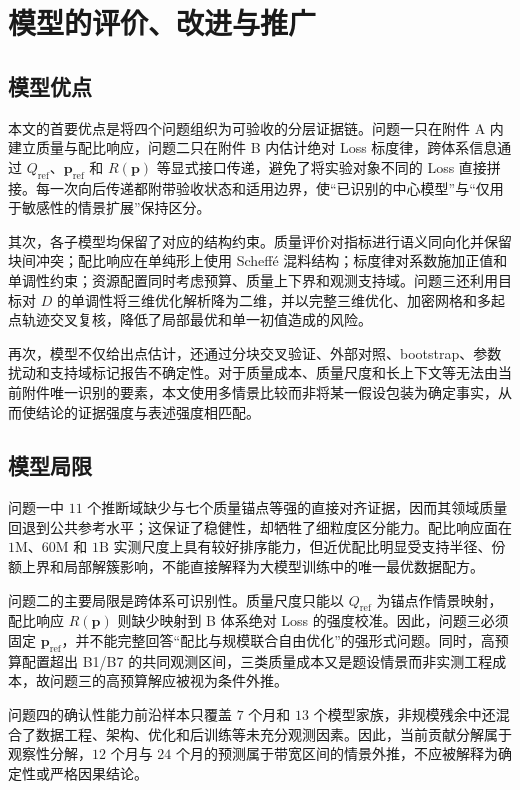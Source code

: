 \section{模型的评价、改进与推广}

\subsection{模型优点}

本文的首要优点是将四个问题组织为可验收的分层证据链。问题一只在附件 A 内建立质量与配比响应，问题二只在附件 B 内估计绝对 Loss 标度律，跨体系信息通过 $Q_{\mathrm{ref}}$、$\boldsymbol p_{\mathrm{ref}}$ 和 $R(\boldsymbol p)$ 等显式接口传递，避免了将实验对象不同的 Loss 直接拼接。每一次向后传递都附带验收状态和适用边界，使“已识别的中心模型”与“仅用于敏感性的情景扩展”保持区分。

其次，各子模型均保留了对应的结构约束。质量评价对指标进行语义同向化并保留块间冲突；配比响应在单纯形上使用 Scheff\'e 混料结构；标度律对系数施加正值和单调性约束；资源配置同时考虑预算、质量上下界和观测支持域。问题三还利用目标对 $D$ 的单调性将三维优化解析降为二维，并以完整三维优化、加密网格和多起点轨迹交叉复核，降低了局部最优和单一初值造成的风险。

再次，模型不仅给出点估计，还通过分块交叉验证、外部对照、bootstrap、参数扰动和支持域标记报告不确定性。对于质量成本、质量尺度和长上下文等无法由当前附件唯一识别的要素，本文使用多情景比较而非将某一假设包装为确定事实，从而使结论的证据强度与表述强度相匹配。

\subsection{模型局限}

问题一中 $11$ 个推断域缺少与七个质量锚点等强的直接对齐证据，因而其领域质量回退到公共参考水平；这保证了稳健性，却牺牲了细粒度区分能力。配比响应面在 $1\mathrm{M}$、$60\mathrm{M}$ 和 $1\mathrm{B}$ 实测尺度上具有较好排序能力，但近优配比明显受支持半径、份额上界和局部解簇影响，不能直接解释为大模型训练中的唯一最优数据配方。

问题二的主要局限是跨体系可识别性。质量尺度只能以 $Q_{\mathrm{ref}}$ 为锚点作情景映射，配比响应 $R(\boldsymbol p)$ 则缺少映射到 B 体系绝对 Loss 的强度校准。因此，问题三必须固定 $\boldsymbol p_{\mathrm{ref}}$，并不能完整回答“配比与规模联合自由优化”的强形式问题。同时，高预算配置超出 B1/B7 的共同观测区间，三类质量成本又是题设情景而非实测工程成本，故问题三的高预算解应被视为条件外推。

问题四的确认性能力前沿样本只覆盖 $7$ 个月和 $13$ 个模型家族，非规模残余中还混合了数据工程、架构、优化和后训练等未充分观测因素。因此，当前贡献分解属于观察性分解，$12$ 个月与 $24$ 个月的预测属于带宽区间的情景外推，不应被解释为确定性或严格因果结论。

